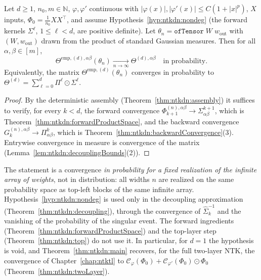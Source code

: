 \begin{theorem}\label{thm:ntkdn:main}
  \leanok
Let $d\ge1$, $n_0,m\in\mathbb N$, $\varphi,\varphi'$ continuous with $|\varphi(x)|,|\varphi'(x)|\le C(1+|x|^p)$, $X$ inputs, $\Phi_0=\frac1{n_0}XX^\top$, and assume Hypothesis~\ref{hyp:ntkdn:nondeg} (the forward kernels $\Sigma^\ell$, $1\le\ell<d$, are positive definite). Let $\theta_n=\texttt{ofTensor}\;W\;w_{\mathrm{out}}$ with $(W,w_{\mathrm{out}})$ drawn from the product of standard Gaussian measures. Then for all $\alpha,\beta\in[m]$,
\[
  \Theta^{\mathrm{emp},(d),\alpha\beta}(\theta_n)\xrightarrow[n\to\infty]{}\Theta^{(d),\alpha\beta}\quad\text{in probability.}
\]
Equivalently, the matrix $\Theta^{\mathrm{emp},(d)}(\theta_n)$ converges in probability to $\Theta^{(d)}=\sum_{\ell=0}^d\Pi^\ell\odot\Sigma^\ell$.
\end{theorem}

\begin{proof}
  \leanok
By the deterministic assembly (Theorem~\ref{thm:ntkdn:assembly}) it suffices to verify, for every $k<d$, the forward convergence $\Phi_{k+1}^{(n),\alpha\beta}\to\Sigma^{k+1}_{\alpha\beta}$, which is Theorem~\ref{thm:ntkdn:forwardProductSpace}, and the backward convergence $G_k^{(n),\alpha\beta}\to\Pi^k_{\alpha\beta}$, which is Theorem~\ref{thm:ntkdn:backwardConvergence}(3). Entrywise convergence in measure is convergence of the matrix (Lemma~\ref{lem:ntkdn:decouplingBounds}(2)).
\end{proof}

\begin{remark}\label{rmk:ntkdn:hypothesisRemark}
The statement is a convergence \emph{in probability for a fixed realization of the infinite array of weights}, not in distribution: all widths $n$ are realized on the same probability space as top-left blocks of the same infinite array. Hypothesis~\ref{hyp:ntkdn:nondeg} is used only in the decoupling approximation (Theorem~\ref{thm:ntkdn:decoupling}), through the convergence of $\hat\Sigma_k^{-1}$ and the vanishing of the probability of the singular event. The forward ingredients (Theorem~\ref{thm:ntkdn:forwardProductSpace}) and the top-layer step (Theorem~\ref{thm:ntkdn:top}) do not use it. In particular, for $d=1$ the hypothesis is void, and Theorem~\ref{thm:ntkdn:main} recovers, for the full two-layer NTK, the convergence of Chapter~\ref{chap:ntktl} to $\mathcal C_\varphi(\Phi_0)+\mathcal C_{\varphi'}(\Phi_0)\odot\Phi_0$ (Theorem~\ref{thm:ntkdn:twoLayer}).
\end{remark}


